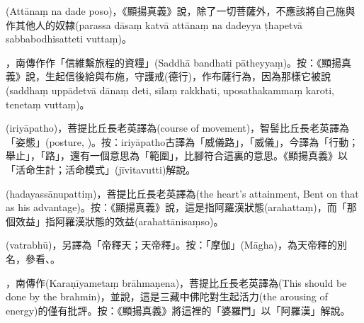 \startitemgroup[noteitems]
\item{}(Attānaṃ na dade poso)，《顯揚真義》說，除了一切菩薩外，不應該將自己施與作其他人的奴隸(parassa dāsaṃ katvā attānaṃ na dadeyya ṭhapetvā sabbabodhisatteti vuttaṃ)。
\stopitemgroup

\startitemgroup[noteitems]
\item{}，南傳作作「信維繫旅程的資糧」(Saddhā bandhati pātheyyaṃ)。按：《顯揚真義》說，生起信後給與布施，守護戒(德行)，作布薩行為，因為那樣它被說(saddhaṃ uppādetvā dānaṃ deti, sīlaṃ rakkhati, uposathakammaṃ karoti, tenetaṃ vuttaṃ)。
\stopitemgroup

\startitemgroup[noteitems]
\item{}(iriyāpatho)，菩提比丘長老英譯為(course of movement)，智髻比丘長老英譯為「姿態」(posture, )。按：iriyāpatho古譯為「威儀路」，「威儀」，今譯為「行動；舉止」，「路」，還有一個意思為「範圍」，比腳符合這裏的意思。《顯揚真義》以「活命生計；活命模式」(jīvitavutti)解說。
\stopitemgroup

\startitemgroup[noteitems]
\item{}(hadayassānupattiṃ)，菩提比丘長老英譯為(the heart's attainment, Bent on that as his advantage)。按：《顯揚真義》說，這是指阿羅漢狀態(arahattaṃ)，而「那個效益」指阿羅漢狀態的效益(arahattānisaṃso)。
\stopitemgroup

\startitemgroup[noteitems]
\item{}(vatrabhū)，另譯為「帝釋天；天帝釋」。按：「摩伽」(Māgha)，為天帝釋的別名，參看、。
\stopitemgroup

\startitemgroup[noteitems]
\item{}，南傳作(Karaṇīyametaṃ brāhmaṇena)，菩提比丘長老英譯為(This should be done by the brahmin)，並說，這是三藏中佛陀對生起活力(the arousing of energy)的僅有批評。按：《顯揚真義》將這裡的「婆羅門」以「阿羅漢」解說。
\stopitemgroup

